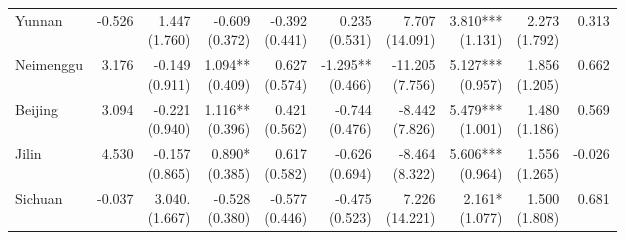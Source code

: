 \documentclass[12pt]{article}
\begin{document}
\begin{landscape}
\begin{small}
\begin{longtable}{lrrrrrrrrr}
    Yunnan & -0.526 & \makecell[r]{1.447\\(1.760)} & \makecell[r]{-0.609\\(0.372)} & \makecell[r]{-0.392\\(0.441)} & \makecell[r]{0.235\\(0.531)} & \makecell[r]{7.707\\(14.091)} & \makecell[r]{3.810***\\(1.131)} & \makecell[r]{2.273\\(1.792)} & 0.313 \\
    Neimenggu & 3.176 & \makecell[r]{-0.149\\(0.911)} & \makecell[r]{1.094**\\(0.409)} & \makecell[r]{0.627\\(0.574)} & \makecell[r]{-1.295**\\(0.466)} & \makecell[r]{-11.205\\(7.756)} & \makecell[r]{5.127***\\(0.957)} & \makecell[r]{1.856\\(1.205)} & 0.662 \\
    Beijing & 3.094 & \makecell[r]{-0.221\\(0.940)} & \makecell[r]{1.116**\\(0.396)} & \makecell[r]{0.421\\(0.562)} & \makecell[r]{-0.744\\(0.476)} & \makecell[r]{-8.442\\(7.826)} & \makecell[r]{5.479***\\(1.001)} & \makecell[r]{1.480\\(1.186)} & 0.569 \\
    Jilin & 4.530 & \makecell[r]{-0.157\\(0.865)} & \makecell[r]{0.890*\\(0.385)} & \makecell[r]{0.617\\(0.582)} & \makecell[r]{-0.626\\(0.694)} & \makecell[r]{-8.464\\(8.322)} & \makecell[r]{5.606***\\(0.964)} & \makecell[r]{1.556\\(1.265)} & -0.026 \\
    Sichuan & -0.037 & \makecell[r]{3.040.\\(1.667)} & \makecell[r]{-0.528\\(0.380)} & \makecell[r]{-0.577\\(0.446)} & \makecell[r]{-0.475\\(0.523)} & \makecell[r]{7.226\\(14.221)} & \makecell[r]{2.161*\\(1.077)} & \makecell[r]{1.500\\(1.808)} & 0.681 \\

\end{longtable}
\end{small}
\end{landscape}
\end{document}
